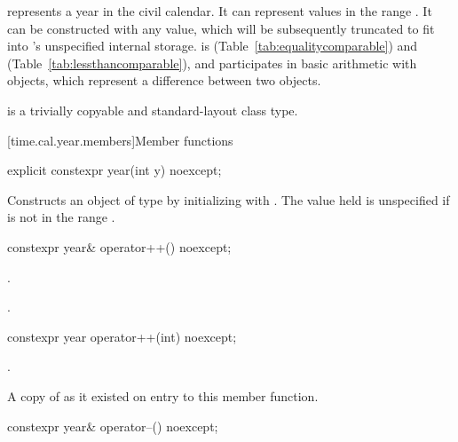 \pnum
{} represents a year in the civil calendar.
It can represent values in the range .
It can be constructed with any  value,
which will be subsequently truncated to fit into 's unspecified internal storage.
 is  (Table~\ref{tab:equalitycomparable})
and  (Table~\ref{tab:lessthancomparable}),
and participates in basic arithmetic with  objects,
which represent a difference between two  objects.

\pnum
{} is a trivially copyable and standard-layout class type.

[time.cal.year.members]{Member functions}

%
\begin{itemdecl}
explicit constexpr year(int y) noexcept;
\end{itemdecl}

\begin{itemdescr}
\pnum
\effects
Constructs an object of type  by
initializing  with .
The value held is unspecified if  is not in the range .
\end{itemdescr}

%
\begin{itemdecl}
constexpr year& operator++() noexcept;
\end{itemdecl}

\begin{itemdescr}
\pnum
\effects {}.

\pnum
\returns {}.
\end{itemdescr}

%
\begin{itemdecl}
constexpr year operator++(int) noexcept;
\end{itemdecl}

\begin{itemdescr}
\pnum
\effects {}.

\pnum
\returns A copy of  as it existed on entry to this member function.
\end{itemdescr}

%
\begin{itemdecl}
constexpr year& operator--() noexcept;
\end{itemdecl}

